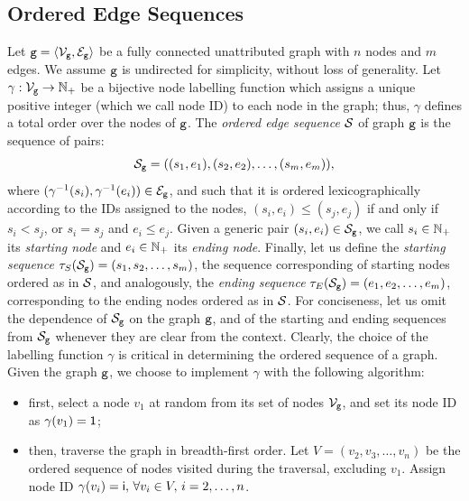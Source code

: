 \subsection{Ordered Edge Sequences}
Let $\Graph{g} = \Tuple{\Nodes{g}, \Edges{g}}$ be a fully connected unattributed graph with $n$ nodes and $m$ edges. We assume $\mathtt{g}$ is undirected for simplicity, without loss of generality. Let $\gamma: \Nodes{g} \shortrightarrow \Natural_{+}$ be a bijective node labelling function which assigns a unique positive integer (which we call node ID) to each node in the graph; thus, $\gamma$ defines a total order over the nodes of $\mathtt{g}$. The \emph{ordered edge sequence} $\Cal{S}$ of graph $\mathtt{g}$ is the sequence of pairs:
$$\OES{S}_{\Graph{g}} = ((s_1, e_1), (s_2, e_2), \ldots, (s_m, e_m)),$$
where $(\gamma^{-1}(s_i), \gamma^{-1}(e_i)) \in \Edges{g}$, and such that it is ordered lexicographically according to the IDs assigned to the nodes, \ie $(s_i,e_i) \leq (s_j,e_j)$ if and only if $s_i < s_j$, or $s_i = s_j$ and $e_i \leq e_j$. Given a generic pair $(s_i,e_i) \in \OES{S}_{\Graph{g}}$, we call $s_i \in \mathbb{N}_{+}$ its \emph{starting node} and $e_i \in \mathbb{N}_{+}$ its \emph{ending node}. Finally, let us define the \emph{starting sequence} $\Start{\OES{S}_{\Graph{g}}} = (s_1, s_2, \ldots, s_m)$, the sequence corresponding of starting nodes ordered as in $\OES{S}$, and analogously, the \emph{ending sequence} $\End{\OES{S}_{\Graph{g}}} = (e_1, e_2, \ldots, e_m)$, corresponding to the ending nodes ordered as in $\OES{S}$. For conciseness, let us omit the dependence of $\OES{S}_{\Graph{g}}$ on the graph $\mathtt{g}$, and of the starting and ending sequences from $\OES{S}_{\Graph{g}}$ whenever they are clear from the context. Clearly, the choice of the labelling function $\gamma$ is critical in determining the ordered sequence of a graph. Given the graph $\mathtt{g}$, we choose to implement $\gamma$ with the following algorithm:
\begin{itemize}
    \item first, select a node $v_1$ at random from its set of nodes $\Nodes{g}$, and set its node ID as $\gamma(v_1) = \mathsf{1}$;
    \item then, traverse the graph in breadth-first order. Let $V = (v_2, v_3, \ldots, v_{n})$ be the ordered sequence of nodes visited during the traversal, excluding $v_1$. Assign node ID $\gamma(v_i) = \mathsf{i},\, \forall v_i \in V,\, i=2, \ldots, n$.
\end{itemize}
